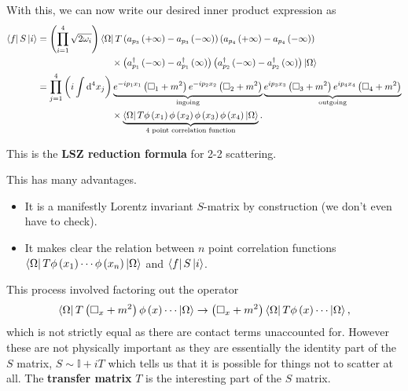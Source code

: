 \begin{definition}
    With this, we can now write our desired inner product expression as
   \begin{align}
        \bra{f} S \ket{i} 
        &= \left( \prod_{i = 1}^{4} \sqrt{2 \omega_i}   \right) \bra{\Omega} T \left( a_{p_3} \left( + \infty \right) - a_{p_3} \left( -\infty \right)  \right)  \left( a_{p_4} \left( + \infty \right) - a_{p_4} \left( -\infty \right)  \right) \nonumber\\
        & \qquad \qquad \qquad \qquad \hfill \times \left( a_{p_1}^{\dag} \left( - \infty \right) - a_{p_1}^{\dag} \left( \infty \right)  \right)   \left( a_{p_2}^{\dag} \left( - \infty \right) - a_{p_2}^{\dag} \left( \infty \right)  \right)  \ket{\Omega} \\
        &= \prod_{j=1}^{4} \left( i \int \dd{^{4}x_j} \right)  \underbrace{e^{-i p_1 x_1} \left( \Box_1 + m^2 \right) e^{-i p_2 x_2} \left( \Box_2 + m^2 \right)}_{\text{ingoing}} \underbrace{e^{i p_3 x_3} \left( \Box_3 + m^2 \right) e^{ip_4 x_4} \left( \Box_4 + m^2 \right)}_{\text{outgoing}} \nonumber \\
        & \qquad \qquad \qquad \qquad \times \underbrace{\bra{\Omega} T \phi \left( x_1 \right) \phi \left( x_2 \right) \phi \left( x_3 \right) \phi \left( x_4 \right) \ket{\Omega}}_{\text{4 point correlation function}}  
    .\end{align}
    
    This is the \textbf{LSZ reduction formula} for 2-2 scattering.

\end{definition}

This has many advantages.
\begin{itemize}
    \item It is a manifestly Lorentz invariant $S$-matrix by construction (we don't even have to check).
    \item It makes clear the relation between $n$ point correlation functions $\bra{\Omega} T \phi \left( x_1 \right) \cdots \phi \left( x_n \right) \ket{\Omega}$ and $\bra{f} S \ket{i}$.
\end{itemize}


\begin{note}
    This process involved factoring out the operator
    \begin{align}
        \bra{\Omega} T \left( \Box_x + m^2 \right) \phi \left( x \right) \cdots \ket{\Omega} \to \left( \Box_x + m^2 \right) \bra{\Omega} T \phi \left( x \right) \cdots \ket{\Omega}
    ,\end{align}
    which is not strictly equal as there are contact terms unaccounted for. However these are not physically important as they are essentially the identity part of the $S$ matrix, $S \sim \mathbb{I} + i T$ which tells us that it is possible for things not to scatter at all. The \textbf{transfer matrix} $T$ is the interesting part of the $S$ matrix.
\end{note}

